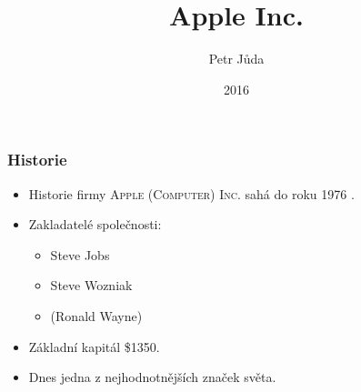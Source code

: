 \documentclass{beamer}
\title{Apple Inc.}
\author{Petr Jůda}
\institute{ITY - projekt 5}
\date{2016}
\begin{document}
\frame{\titlepage}
 
\begin{frame}
\frametitle{Historie}
\begin{itemize}
 \item Historie firmy \textsc{Apple (Computer) Inc.} sahá do roku 1976 \cite{Wikipedia:Apple}.
 \item Zakladatelé společnosti: 
 	\begin{itemize}
	\item Steve Jobs
	\item Steve Wozniak
	\item (Ronald Wayne)
	\end{itemize}
 \item Základní kapitál \$1350.
 \item Dnes jedna z nejhodnotnějších značek světa.
\end{itemize}
\end{frame}
 
\end{document}
